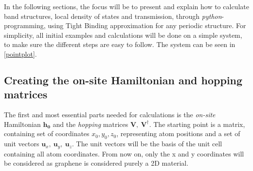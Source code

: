  In the following sections, the focus will be to present and explain how to calculate band structures, local density of states and transmission, through \textit{python}-programming, using Tight Binding approximation for any periodic structure. For simplicity, all initial examples and calculations will be done on a simple system, to make sure the different steps are easy to follow. The system can be seen in \cref{pointplot}.
\subsection{Creating the on-site Hamiltonian and hopping matrices}
The first and most essential parts needed for calculations is the \textit{on-site} Hamiltonian \(\mathbf{h_0}\) and the \textit{hopping} matrices \(\mathbf{V},\ \mathbf{V}^{\dagger}\). The starting point is a matrix, containing set of coordinates \(x_0,y_0,z_0\), representing atom positions  and a set of unit vectors \(\mathbf{u}_x, \ \mathbf{u}_y, \ \mathbf{u}_z\). The unit vectors will be the basis of the unit cell containing all atom coordinates. From now on, only the x and y coordinates will be considered as graphene is considered purely a 2D material.
